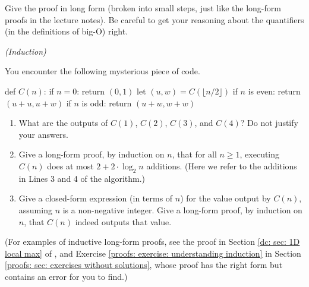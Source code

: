 \documentclass[11pt]{article}
\begin{document}
Give the proof in long form (broken into small steps, just like the long-form proofs in the lecture notes). 
Be careful to get your reasoning about the quantifiers (in the definitions of big-O) right.







\newpage

\problem\emph{(Induction)} {\small
  You encounter the following mysterious piece of code.

  \begin{myframed}
    \begin{steps}
    \item[] def $C(n)$:
      \step if  $n=0$: return $(0,1)$
      \step let $(u,w) = C(\lfloor n/2 \rfloor)$
      \step if $n$ is even:  return $(u+u, u + w)$
      \step if $n$ is odd: return $(u + w, w + w)$
    \end{steps}
  \end{myframed}

  \begin{enumerate}[label=(\alph*)] \small
  \item What are the outputs of $C(1)$, $C(2)$, $C(3)$, and $C(4)$?  Do not justify your answers.

  \item Give a long-form proof, by induction on $n$, that for all $n\ge 1$, executing $C(n)$ does at most
    $2 + 2 \cdot \log_2 n$ additions.  (Here we refer to the additions in Lines 3 and 4 of the algorithm.)

  \item Give a closed-form expression (in terms of $n$) for the value output by $C(n)$,
    assuming $n$ is a non-negative integer.
    Give a long-form proof, by induction on $n$, that $C(n)$ indeed outputs that value.

  \end{enumerate}
  (For examples of inductive long-form proofs, see the proof in Section \ref{dc: sec: 1D local max} of ,
  and Exercise \ref{proofs: exercise: understanding induction} in Section \ref{proofs: sec: exercises without solutions}, whose proof has the right form but contains an error for you to find.)
}
\end{document}
